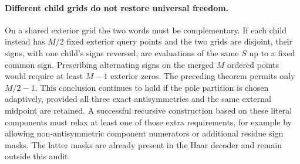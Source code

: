 \documentclass[11pt]{article}
\begin{document}
\paragraph{Different child grids do not restore universal freedom.}
On a shared exterior grid the two words must be complementary. If each
child instead has $M/2$ fixed exterior query points and the two grids are
disjoint, their signs, with one child's signs reversed, are evaluations
of the same $S$ up to a fixed common sign. Prescribing alternating signs
on the merged $M$ ordered points would require at least $M-1$ exterior
zeros. The preceding theorem permits only $M/2-1$. This conclusion
continues to hold if the pole partition is chosen adaptively, provided
all three exact antisymmetries and the same external midpoint are
retained. A successful recursive construction based on these literal components
must relax at least one
of those extra requirements, for example by allowing non-antisymmetric
component numerators or additional residue sign masks. The latter masks
are already present in the Haar decoder and remain outside this audit.
\end{document}

